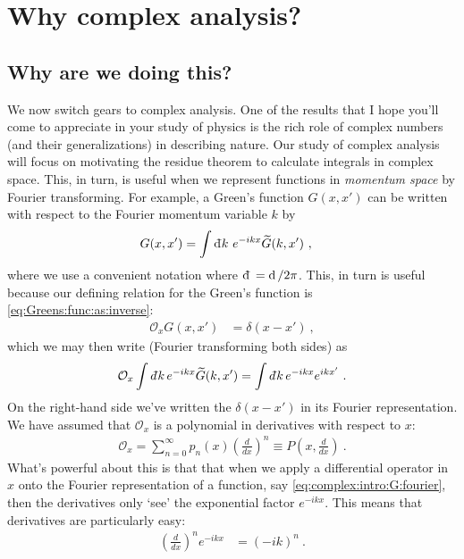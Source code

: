 \chapter{Why complex analysis?}

\section{Why are we doing this?}

We now switch gears to complex analysis. One of the results that I hope you'll come to appreciate in your study of physics is the rich role of complex numbers (and their generalizations) in describing nature. Our study of complex analysis will focus on motivating the residue theorem to calculate integrals in complex space. This, in turn, is useful when we represent functions in \emph{momentum space} by Fourier transforming. For example, a Green's function $G(x,x')$ can be written with respect to the Fourier momentum variable $k$ by
\begin{align}
  G(x,x') &= \int \Dbar{k} \, e^{-ikx} \tilde G(k,x') \ ,
  \label{eq:complex:intro:G:fourier}
\end{align}
where we use a convenient notation where $\Dbar{} = \D{}/2\pi$. This, in turn is useful because our defining relation for the Green's function is \eqref{eq:Greens:func:as:inverse}:
\begin{align}
  \mathcal O_xG(x,x') &= \delta(x-x') \ ,
\end{align}
which we may then write (Fourier transforming both sides) as
\begin{align}
  \mathcal O_x \int \dbar k \, e^{-ikx} \tilde G(k,x') 
  =
  \int \dbar k \, e^{-ikx} e^{ikx'} \ .
  \label{eq:complex:intro:defining:G:}
\end{align}
On the right-hand side we've written the $\delta(x-x')$ in its Fourier representation. We have assumed that $\mathcal O_x$ is a polynomial in derivatives with respect to $x$:
\begin{align}
  \mathcal O_x = \sum_{n=0}^{\infty}
  p_n(x) \left(\frac{d}{dx}\right)^n
  \equiv P\left(x,\frac{d}{dx}\right) \ .
  \label{eq:complex:intro:defining:Ox}
\end{align}
What's powerful about this is that that when we apply a differential operator in $x$ onto the Fourier representation of a function, say \eqref{eq:complex:intro:G:fourier}, then the derivatives only `see' the exponential factor $e^{-ikx}$. This means that derivatives are particularly easy:
\begin{align}
  \left(\frac{d}{dx}\right)^n e^{-ikx} &= (-ik)^n \ .
\end{align}
